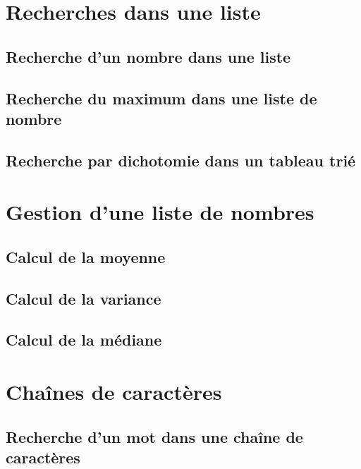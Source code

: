 \documentclass[10pt]{article}
\begin{document}


\setlength{\parskip}{0ex plus 0.2ex minus 0ex}
 \renewcommand{\contentsname}{}
 \renewcommand{\baselinestretch}{1}

\tableofcontents

 \renewcommand{\baselinestretch}{1.2}
\setlength{\parskip}{2ex plus 0.5ex minus 0.2ex}



\section{Recherches dans une liste}
\subsection{Recherche d'un nombre dans une liste}
\subsection{Recherche du maximum dans une liste de nombre}
\subsection{Recherche par dichotomie dans un tableau trié}

\section{Gestion d'une liste de nombres}
\subsection{Calcul de la moyenne}
\subsection{Calcul de la variance}
\subsection{Calcul de la médiane} %

\section{Chaînes de caractères}
\subsection{Recherche d'un mot dans une chaîne de caractères}
\end{document}

